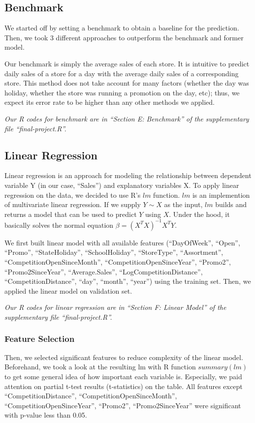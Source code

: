 \documentclass[letterpaper,twocolumn,11pt]{article}
\begin{document}
\subsection{Benchmark}
We started off by setting a benchmark to obtain a baseline for the prediction. Then, we took 3 different approaches to outperform the benchmark and former model.

Our benchmark is simply the average sales of each store. It is intuitive to predict daily sales of a store for a day with the average daily sales of a corresponding store. This method does not take account for many factors (whether the day was holiday, whether the store was running a promotion on the day, etc); thus, we expect its error rate to be higher than any other methods we applied.

\textit{Our R codes for benchmark are in ``Section E: Benchmark'' of the supplementary file ``final-project.R''.}

\subsection{Linear Regression}
Linear regression is an approach for modeling the relationship between dependent variable Y (in our case, ``Sales'') and explanatory variables X. To apply linear regression on the data, we decided to use R's $lm$ function. $lm$ is an implemention of multivariate linear regression. If we supply $Y \sim X$ as the input, $lm$ builds and returns a model that can be used to predict $Y$ using $X$. Under the hood, it basically solves the normal equation $\beta = (X^T X)^{-1} X^T Y$.

We first built linear model with all available features (``DayOfWeek'', ``Open'', ``Promo'', ``StateHoliday'', ``SchoolHoliday'', ``StoreType'', ``Assortment'', ``CompetitionOpenSinceMonth'', ``CompetitionOpenSinceYear'', ``Promo2'', ``Promo2SinceYear'', ``Average.Sales'', ``LogCompetitionDistance'', ``CompetitionDistance'', ``day'', ``month'', ``year'') using the training set. Then, we applied the linear model on validation set.

\textit{Our R codes for linear regression are in ``Section F: Linear Model'' of the supplementary file ``final-project.R''.}

\subsubsection{Feature Selection}
Then, we selected significant features to reduce complexity of the linear model. Beforehand, we took a look at the resulting lm with R function $summary(lm)$ to get some general idea of how important each variable is. Especially, we paid attention on partial t-test results (t-statistics) on the table. All features except ``CompetitionDistance'', ``CompetitionOpenSinceMonth'', ``CompetitionOpenSinceYear'', ``Promo2'', ``Promo2SinceYear'' were significant with p-value less than 0.05.
\end{document}
